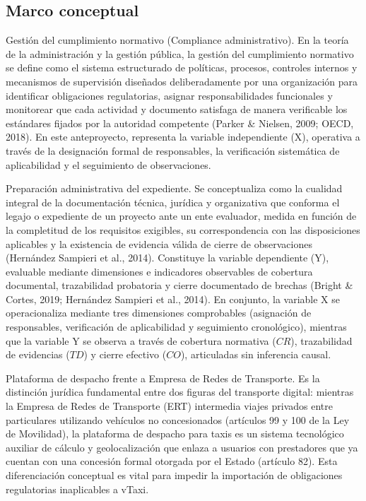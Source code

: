 {\subsection{Marco conceptual}
Gestión del cumplimiento normativo (Compliance administrativo). En la teoría de la administración y la gestión pública, la gestión del cumplimiento normativo se define como el sistema estructurado de políticas, procesos, controles internos y mecanismos de supervisión diseñados deliberadamente por una organización para identificar obligaciones regulatorias, asignar responsabilidades funcionales y monitorear que cada actividad y documento satisfaga de manera verificable los estándares fijados por la autoridad competente (Parker \& Nielsen, 2009; OECD, 2018). En este anteproyecto, representa la variable independiente (X), operativa a través de la designación formal de responsables, la verificación sistemática de aplicabilidad y el seguimiento de observaciones.


Preparación administrativa del expediente. Se conceptualiza como la cualidad integral de la documentación técnica, jurídica y organizativa que conforma el legajo o expediente de un proyecto ante un ente evaluador, medida en función de la completitud de los requisitos exigibles, su correspondencia con las disposiciones aplicables y la existencia de evidencia válida de cierre de observaciones (Hernández Sampieri et al., 2014). Constituye la variable dependiente (Y), evaluable mediante dimensiones e indicadores observables de cobertura documental, trazabilidad probatoria y cierre documentado de brechas (Bright \& Cortes, 2019; Hernández Sampieri et al., 2014). En conjunto, la variable X se operacionaliza mediante tres dimensiones comprobables (asignación de responsables, verificación de aplicabilidad y seguimiento cronológico), mientras que la variable Y se observa a través de cobertura normativa ($CR$), trazabilidad de evidencias ($TD$) y cierre efectivo ($CO$), articuladas sin inferencia causal.


Plataforma de despacho frente a Empresa de Redes de Transporte. Es la distinción jurídica fundamental entre dos figuras del transporte digital: mientras la Empresa de Redes de Transporte (ERT) intermedia viajes privados entre particulares utilizando vehículos no concesionados (artículos 99 y 100 de la Ley de Movilidad), la plataforma de despacho para taxis es un sistema tecnológico auxiliar de cálculo y geolocalización que enlaza a usuarios con prestadores que ya cuentan con una concesión formal otorgada por el Estado (artículo 82). Esta diferenciación conceptual es vital para impedir la importación de obligaciones regulatorias inaplicables a vTaxi.


}
